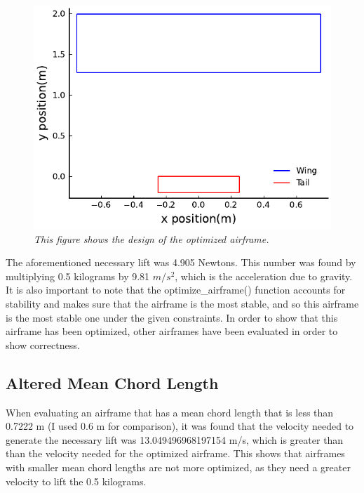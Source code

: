 \documentclass{journal}
\begin{document}
	\begin{figure}[H]
		\includegraphics{../graphics/ideal_design.pdf}
		\caption{\emph{This figure shows the design of the optimized airframe.}}
		\label{fig:ideal_design}
	\end{figure}

	The aforementioned necessary lift was 4.905 Newtons. This number was found by multiplying 0.5 kilograms by 9.81 \(m/s^2\), which is the acceleration due to gravity. It is also important to note that the optimize\_airframe() function accounts for stability and makes sure that the airframe is the most stable, and so this airframe is the most stable one under the given constraints. In order to show that this airframe has been optimized, other airframes have been evaluated in order to show correctness.\\
	
	\subsection{Altered Mean Chord Length}

	When evaluating an airframe that has a mean chord length that is less than 0.7222 m (I used 0.6 m for comparison), it was found that the velocity needed to generate the necessary lift was 13.049496968197154 m/s, which is greater than than the velocity needed for the optimized airframe. This shows that airframes with smaller mean chord lengths are not more optimized, as they need a greater velocity to lift the 0.5 kilograms.\\
	
\end{document}
